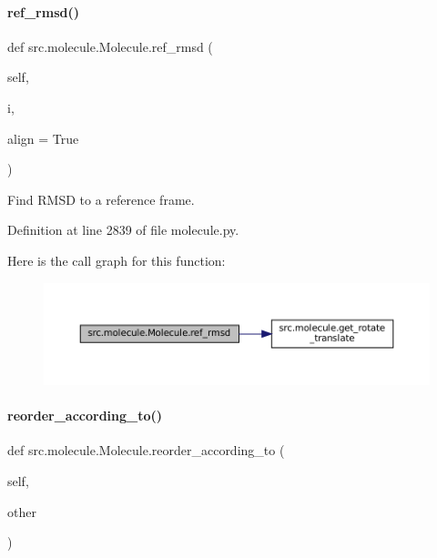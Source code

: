 \paragraph{\texorpdfstring{ref\+\_\+rmsd()}{ref\_rmsd()}}
{\footnotesize\ttfamily def src.\+molecule.\+Molecule.\+ref\+\_\+rmsd (\begin{DoxyParamCaption}\item[{}]{self,  }\item[{}]{i,  }\item[{}]{align = {\ttfamily True} }\end{DoxyParamCaption})}



Find R\+M\+SD to a reference frame. 



Definition at line 2839 of file molecule.\+py.

Here is the call graph for this function\+:
\nopagebreak
\begin{figure}[H]
\begin{center}
\leavevmode
\includegraphics[width=350pt]{classsrc_1_1molecule_1_1Molecule_a029c994fba2c8388259bd062def28fde_cgraph}
\end{center}
\end{figure}
\mbox{\label{classsrc_1_1molecule_1_1Molecule_a16dcb06bf37392ef659cc156e0b61688}} 
\paragraph{\texorpdfstring{reorder\+\_\+according\+\_\+to()}{reorder\_according\_to()}}
{\footnotesize\ttfamily def src.\+molecule.\+Molecule.\+reorder\+\_\+according\+\_\+to (\begin{DoxyParamCaption}\item[{}]{self,  }\item[{}]{other }\end{DoxyParamCaption})}



